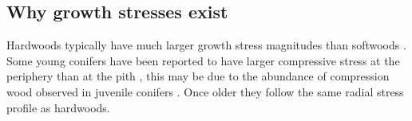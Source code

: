 \subsection{Why growth stresses exist}
Hardwoods typically have much larger growth stress magnitudes than softwoods \citep{barnett1981xylem}. Some young conifers have been
reported to have larger compressive stress at the periphery than at the pith \citep{jacobs1945l}, this may be due to the abundance of compression wood observed in juvenile conifers \citep{timell1986compression}. Once older they follow the same radial stress profile
as hardwoods.